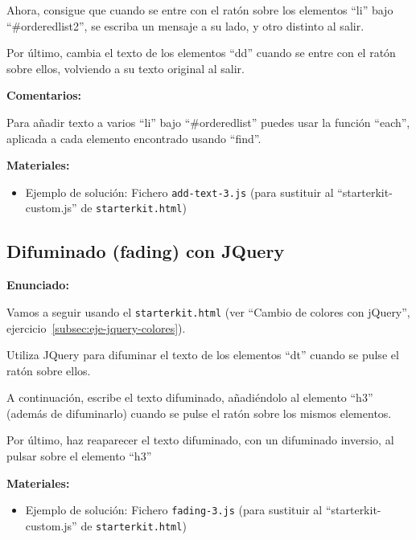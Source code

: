Ahora, consigue que cuando se entre con el ratón sobre los elementos ``li'' bajo ``\#orderedlist2'', se escriba un mensaje a su lado, y otro distinto al salir.

Por último, cambia el texto de los elementos ``dd'' cuando se entre con el ratón sobre ellos, volviendo a su texto original al salir.

\textbf{Comentarios:}

Para añadir texto a varios ``li'' bajo ``\#orderedlist'' puedes usar la función ``each'', aplicada a cada elemento encontrado usando ``find''.

\textbf{Materiales:}

\begin{itemize}
\item Ejemplo de solución: Fichero \verb|add-text-3.js|
  (para sustituir al ``starterkit-custom.js'' de \verb|starterkit.html|)
\end{itemize}

\subsection{Difuminado (fading) con JQuery}
\label{subsec:eje-jquery-fading}

\textbf{Enunciado:}

Vamos a seguir usando el \verb|starterkit.html| (ver ``Cambio de colores con jQuery'', ejercicio~\ref{subsec:eje-jquery-colores}).

Utiliza JQuery para difuminar el texto de los elementos ``dt'' cuando se pulse el ratón sobre ellos.

A continuación, escribe el texto difuminado, añadiéndolo al elemento ``h3'' (además de difuminarlo) cuando se pulse el ratón sobre los mismos elementos.

Por último, haz reaparecer el texto difuminado, con un difuminado inversio, al pulsar sobre el elemento ``h3''


\textbf{Materiales:}

\begin{itemize}
\item Ejemplo de solución: Fichero \verb|fading-3.js|
  (para sustituir al ``starterkit-custom.js'' de \verb|starterkit.html|)
\end{itemize}


